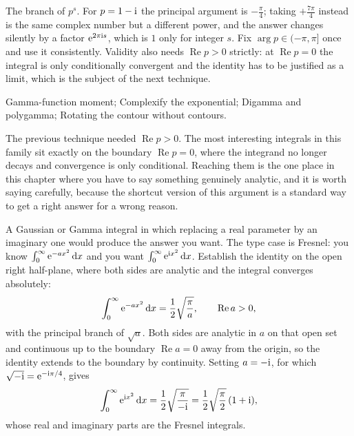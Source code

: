 \begin{trap}
The branch of $p^{s}$. For $p=1-\mathrm{i}$ the principal argument is $-\tfrac\pi4$; taking $+\tfrac{7\pi}{4}$ instead is the same complex number but a different power, and the answer changes silently by a factor $\mathrm{e}^{2\pi\mathrm{i} s}$, which is $1$ only for integer $s$. Fix $\arg p\in(-\pi,\pi]$ once and use it consistently. Validity also needs $\operatorname{Re}p>0$ strictly: at $\operatorname{Re}p=0$ the integral is only conditionally convergent and the identity has to be justified as a limit, which is the subject of the next technique.
\end{trap}

\begin{seealsob}Gamma-function moment; Complexify the exponential; Digamma and polygamma; Rotating the contour without contours.\end{seealsob}

The previous technique needed $\operatorname{Re}p>0$. The most interesting integrals in this family sit exactly on the boundary $\operatorname{Re}p=0$, where the integrand no longer decays and convergence is only conditional. Reaching them is the one place in this chapter where you have to say something genuinely analytic, and it is worth saying carefully, because the shortcut version of this argument is a standard way to get a right answer for a wrong reason.

\cue A Gaussian or Gamma integral in which replacing a real parameter by an imaginary one would produce the answer you want. The type case is Fresnel: you know $\int_0^{\infty}\mathrm{e}^{-ax^{2}}\,\mathrm{d} x$ and you want $\int_0^{\infty}\mathrm{e}^{\mathrm{i} x^{2}}\,\mathrm{d} x$.
\method Establish the identity on the open right half-plane, where both sides are analytic and the integral converges absolutely:
\[\int_0^{\infty}\mathrm{e}^{-ax^{2}}\,\mathrm{d} x=\frac12\sqrt{\frac{\pi}{a}},\qquad \operatorname{Re}a>0,\]
with the principal branch of $\sqrt a$. Both sides are analytic in $a$ on that open set and continuous up to the boundary $\operatorname{Re}a=0$ away from the origin, so the identity extends to the boundary by continuity. Setting $a=-\mathrm{i}$, for which $\sqrt{-\mathrm{i}}=\mathrm{e}^{-\mathrm{i}\pi/4}$, gives
\[\int_0^{\infty}\mathrm{e}^{\mathrm{i} x^{2}}\,\mathrm{d} x=\frac12\sqrt{\frac{\pi}{-\mathrm{i}}}=\frac12\sqrt{\frac{\pi}{2}}\,(1+\mathrm{i}),\]
whose real and imaginary parts are the Fresnel integrals.

